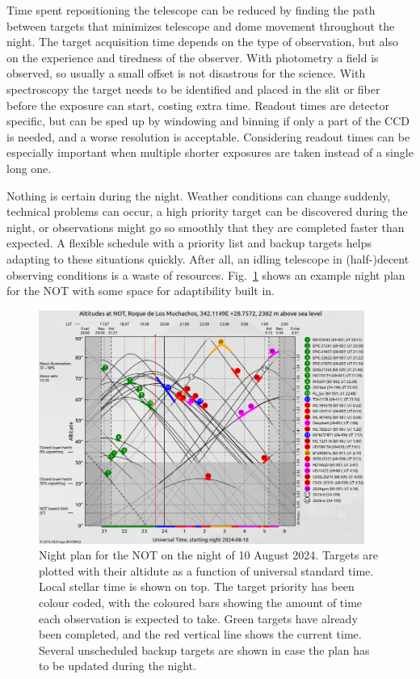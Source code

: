 \documentclass[a4paper,oneside,12pt, class=Latex/Classes/PhDthesisPSnPDF, crop=false]{standalone}
\begin{document}
Time spent repositioning the telescope can be reduced by finding the path between targets that minimizes telescope and dome movement throughout the night. The target acquisition time depends on the type of observation, but also on the experience and tiredness of the observer. With photometry a field is observed, so usually a small offset is not disastrous for the science. With spectroscopy the target needs to be identified and placed in the slit or fiber before the exposure can start, costing extra time. Readout times are detector specific, but can be sped up by windowing and binning if only a part of the CCD is needed, and a worse resolution is acceptable. Considering readout times can be especially important when multiple shorter exposures are taken instead of a single long one.

Nothing is certain during the night. Weather conditions can change suddenly, technical problems can occur, a high priority target can be discovered during the night, or observations might go so smoothly that they are completed faster than expected. A flexible schedule with a priority list and backup targets helps adapting to these situations quickly. After all, an idling telescope in (half-)decent observing conditions is a waste of resources. Fig.~\ref{visplot} shows an example night plan for the NOT with some space for adaptibility built in.

\begin{figure}
    \centering
    \includegraphics[width=0.95\textwidth]{../Images/chapter_2/visplot.png}
    \caption{Night plan for the NOT on the night of 10 August 2024. Targets are plotted with their altidute as a function of universal standard time. Local stellar time is shown on top. The target priority has been colour coded, with the coloured bars showing the amount of time each observation is expected to take. Green targets have already been completed, and the red vertical line shows the current time. Several unscheduled backup targets are shown in case the plan has to be updated during the night.}
    \label{visplot}
\end{figure}
\end{document}
